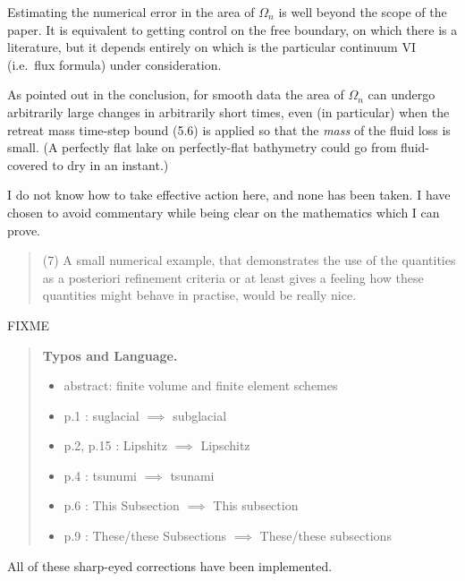 \documentclass[12pt]{amsart}
\newcommand{\mm}{\medskip \noindent}
\begin{document}
Estimating the numerical error in the area of $\Omega_n$ is well beyond the scope of the paper.  It is equivalent to getting control on the free boundary, on which there is a literature, but it depends entirely on which is the particular continuum VI (i.e.~flux formula) under consideration.

As pointed out in the conclusion, for smooth data the area of $\Omega_n$ can undergo arbitrarily large changes in arbitrarily short times, even (in particular) when the retreat mass time-step bound (5.6) is applied so that the \emph{mass} of the fluid loss is small.  (A perfectly flat lake on perfectly-flat bathymetry could go from fluid-covered to dry in an instant.)

I do not know how to take effective action here, and none has been taken.  I have chosen to avoid commentary while being clear on the mathematics which I can prove.

\begin{quote}
\mm (7) A small numerical example, that demonstrates the use of the quantities as a posteriori refinement criteria or at least gives a feeling how these quantities might behave in practise, would be really nice.
\end{quote}

FIXME

\begin{quote}
\textbf{Typos and Language.}

\begin{itemize}
\item abstract: finite volume and finite element schemes
\item p.1 : suglacial $\implies$ subglacial
\item p.2, p.15 : Lipshitz $\implies$ Lipschitz
\item p.4 : tsunumi $\implies$ tsunami
\item p.6 : This Subsection $\implies$ This subsection
\item p.9 : These/these Subsections $\implies$ These/these subsections
\end{itemize}
\end{quote}

All of these sharp-eyed corrections have been implemented.
\end{document}
